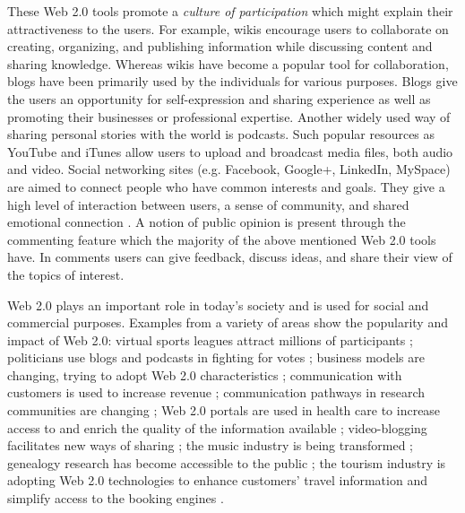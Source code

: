 These Web 2.0 tools promote a \textit{culture of participation}
\citep{Shelly2011} which might explain their attractiveness to the users. For
example, wikis encourage users to collaborate on creating, organizing, and
publishing information while discussing content and sharing knowledge. Whereas
wikis have become a popular tool for collaboration, blogs have been primarily
used by the individuals for various purposes. Blogs give the users an
opportunity for self-expression and sharing experience as well as promoting
their businesses or professional expertise. Another widely used way of sharing
personal stories with the world is podcasts. Such popular resources as YouTube
and iTunes allow users to upload and broadcast media files, both audio and
video. Social networking sites (e.g. Facebook, Google+, LinkedIn, MySpace) are
aimed to connect people who have common interests and goals. They give a high
level of interaction between users, a sense of community, and shared emotional
connection \citep{Zhan2010}. A notion of public opinion is present through the
commenting feature which the majority of the above mentioned Web 2.0 tools have.
In comments users can give feedback, discuss ideas, and share their view of the
topics of interest.

Web 2.0 plays an important role in today's society and is used for social and
commercial purposes. Examples from a variety of areas show the popularity and
impact of Web 2.0: virtual sports leagues attract millions of participants
\citep{Holahan2006}; politicians use blogs and podcasts in fighting for votes
\citep{Capell2006}; business models are changing, trying to adopt Web 2.0
characteristics \citep{Wirtz2010}; communication with customers is used to
increase revenue \citep{Havenstein2007}; communication pathways in research
communities are changing \citep{Ashling2007}; Web 2.0 portals are used in health
care to increase access to and enrich the quality of the information available
\citep{Gorlitz2010,Metzger2011}; video-blogging facilitates new ways of sharing
\citep{LibraryTechnologyReports2007}; the music industry is being transformed
\citep{Holahan2007}; genealogy research has become accessible to the public
\citep{MacMillan2007}; the tourism industry is adopting Web 2.0 technologies to
enhance customers' travel information and simplify access to the booking engines
\citep{Leung2011}.

